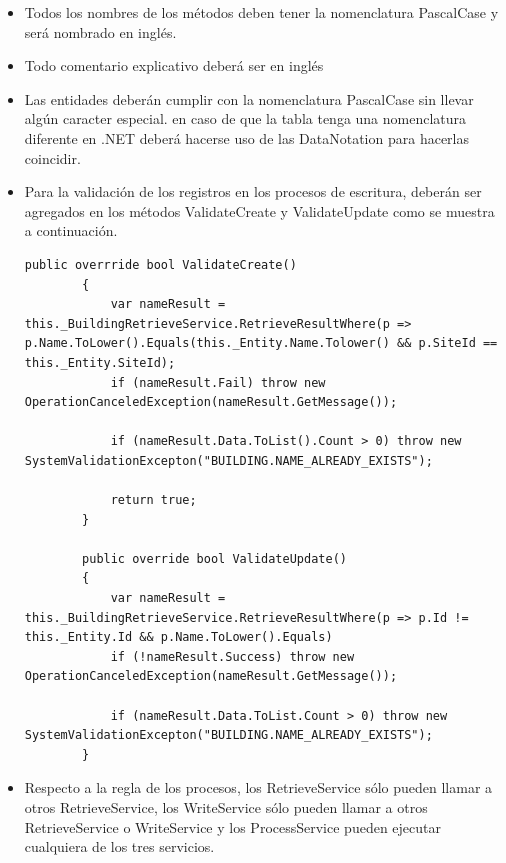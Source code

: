 \documentclass[a4paper, 10pt]{article}
\begin{document}
\begin{itemize}
	\item Todos los nombres de los métodos deben tener la nomenclatura \sffamily PascalCase \normalfont y será nombrado en inglés.
	
	\item Todo comentario explicativo deberá ser en inglés
	
	\item Las entidades deberán cumplir con la nomenclatura \sffamily PascalCase \normalfont sin llevar algún caracter especial. en caso de que la tabla tenga una nomenclatura diferente en .NET deberá hacerse uso de las \sffamily DataNotation \normalfont para hacerlas coincidir.
	
	\item Para la validación de los registros en los procesos de escritura, deberán ser agregados en los métodos \sffamily ValidateCreate y ValidateUpdate \normalfont como se muestra a continuación.
	
	\begin{lstlisting}[language={[Sharp]C}]
		public overrride bool ValidateCreate()
		{
			var nameResult = this._BuildingRetrieveService.RetrieveResultWhere(p => p.Name.ToLower().Equals(this._Entity.Name.Tolower() && p.SiteId == this._Entity.SiteId);
			if (nameResult.Fail) throw new OperationCanceledException(nameResult.GetMessage());
			
			if (nameResult.Data.ToList().Count > 0) throw new SystemValidationExcepton("BUILDING.NAME_ALREADY_EXISTS");
			
			return true;		
		}
		
		public override bool ValidateUpdate()
		{
			var nameResult = this._BuildingRetrieveService.RetrieveResultWhere(p => p.Id != this._Entity.Id && p.Name.ToLower().Equals)
			if (!nameResult.Success) throw new OperationCanceledException(nameResult.GetMessage());
			
			if (nameResult.Data.ToList.Count > 0) throw new SystemValidationExcepton("BUILDING.NAME_ALREADY_EXISTS");
		}
	\end{lstlisting}
	
	\item Respecto a la regla de los procesos, los \sffamily RetrieveService \normalfont sólo pueden llamar a otros \sffamily RetrieveService, \normalfont los \sffamily WriteService \normalfont sólo pueden llamar a otros \sffamily RetrieveService o WriteService \normalfont y los \sffamily ProcessService \normalfont pueden ejecutar cualquiera de los tres servicios.
	

\end{itemize}
\end{document}
